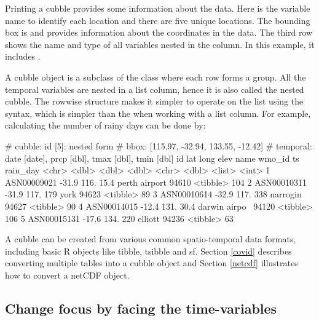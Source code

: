 \documentclass[
]{jss}
\begin{document}
Printing a cubble provides some information about the data. Here  is the variable name to identify each location and there are five unique locations. The bounding box is \code{[115.97, -32.94, 133.55, -12.42]} and provides information about the coordinates in the data. The third row shows the name and type of all variables nested in the  column. In this example, it includes .

A cubble object is a subclass of the  class where each row forms a group. All the temporal variables are nested in a list column, hence it is also called the nested cubble. The rowwise structure makes it simpler to operate on the list using the  syntax, which is simpler than the  when working with a list column. For example, calculating the number of rainy days can be done by:

\begin{CodeChunk}
\begin{CodeOutput}
# cubble:   id [5]: nested form
# bbox:     [115.97, -32.94, 133.55, -12.42]
# temporal: date [date], prcp [dbl], tmax [dbl], tmin [dbl]
  id            lat  long  elev name          wmo_id ts       rain_day
  <chr>       <dbl> <dbl> <dbl> <chr>          <dbl> <list>      <int>
1 ASN00009021 -31.9  116.  15.4 perth airport  94610 <tibble>      104
2 ASN00010311 -31.9  117. 179   york           94623 <tibble>       89
3 ASN00010614 -32.9  117. 338   narrogin       94627 <tibble>       90
4 ASN00014015 -12.4  131.  30.4 darwin airpo~  94120 <tibble>      106
5 ASN00015131 -17.6  134. 220   elliott        94236 <tibble>       63
\end{CodeOutput}
\end{CodeChunk}

A cubble can be created from various common spatio-temporal data formats, including basic R objects like tibble, tsibble and sf. Section \ref{covid} describes converting multiple tables into a cubble object and Section \ref{netcdf} illustrates how to convert a netCDF object.

\hypertarget{change-focus-by-facing-the-time-variables}{%
\subsection{Change focus by facing the time-variables}\label{change-focus-by-facing-the-time-variables}}
\end{document}
